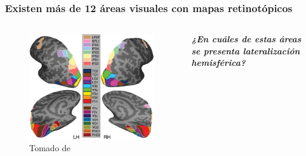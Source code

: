 \documentclass[
11pt, %
%
aspectratio=169, %
]{beamer}
\begin{document}
\begin{frame}
	\frametitle{Existen m\'as de 12 \'areas visuales con mapas retinot\'opicos}
	\begin{columns}[c] %
		\begin{column}{0.7\textwidth} %
			\begin{figure}
				\includegraphics[scale=0.55]{Graphics/brain_wang}
				\captionsetup{font=tiny}
				\caption{Tomado de \cite{wang_probabilistic_2015}}
			\end{figure}	
			
		\end{column}
		
		\begin{column}{0.35\textwidth}
			\centering
		\textbf{\textit{¿En cu\'ales de estas \'areas se presenta lateralizaci\'on hemisf\'erica?}}
		\end{column}
		
		
	\end{columns}
	
	
	
\end{frame}
		
	
\end{document}
